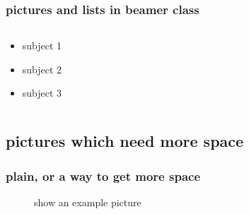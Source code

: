\documentclass{beamer}
\begin{document}
\begin{frame}
\frametitle{pictures and lists in beamer class}
\begin{columns}
\begin{column}{5cm}
\begin{itemize}
\item<1-> subject 1
\item<3-> subject 2
\item<5-> subject 3
\end{itemize}
\vspace{3cm}
\end{column}
\begin{column}{5cm}
\begin{overprint}
\end{overprint}
\end{column}
\end{columns}
\end{frame}


\subsection{pictures which need more space}
\begin{frame}[plain]
\frametitle{plain, or a way to get more space}
\begin{figure}
\caption{show an example picture}
\end{figure}
\end{frame}
\end{document}
